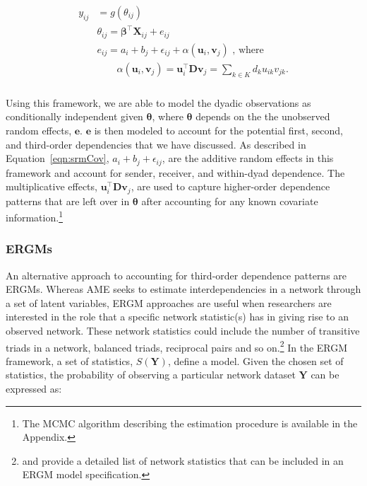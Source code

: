 \documentclass[12pt,pdflatex]{elsarticle}
\begin{document}
\begin{align}
\begin{aligned}
	y_{ij} &= g(\theta_{ij}) \\
	&\theta_{ij} = \bm\beta^{\top} \mathbf{X}_{ij} + e_{ij} \\
	&e_{ij} = a_{i} + b_{j}  + \epsilon_{ij} + \alpha(\textbf{u}_{i}, \textbf{v}_{j}) \text{  , where } \\
	&\qquad \alpha(\textbf{u}_{i}, \textbf{v}_{j}) = \textbf{u}_{i}^{\top} \textbf{D} \textbf{v}_{j} = \sum_{k \in K} d_{k} u_{ik} v_{jk}. \\
\label{eqn:ame}
\end{aligned}
\end{align}

Using this framework, we are able to model the dyadic observations as conditionally independent given $\bm\theta$, where $\bm\theta$ depends on the the unobserved random effects, $\mathbf{e}$. $\mathbf{e}$ is then modeled to account for the potential first, second, and third-order dependencies that we have discussed. As described in Equation~\ref{eqn:srmCov}, $a_{i} + b_{j}  + \epsilon_{ij}$, are the additive random effects in this framework and account for sender, receiver, and within-dyad dependence. The multiplicative effects, $\textbf{u}_{i}^{\top} \textbf{D} \textbf{v}_{j}$, are used to capture higher-order dependence patterns that are left over in $\bm\theta$ after accounting for any known covariate information.\footnote{The MCMC algorithm describing the estimation procedure is available in the Appendix.} 

\subsubsection*{\textbf{ERGMs}}

An alternative approach to accounting for third-order dependence patterns are ERGMs. Whereas AME seeks to estimate interdependencies in a network through a set of latent variables, ERGM approaches are useful when researchers are interested in the role that a specific network statistic(s) has in giving rise to an observed network. These network statistics could include the number of transitive triads in a network, balanced triads, reciprocal pairs and so on.\footnote{\citet{morris:etal:2008} and \citet{snijders:etal:2006} provide a detailed list of network statistics that can be included in an ERGM model specification.} In the ERGM framework, a set of statistics, $S(\mathbf{Y})$, define a model. Given the chosen set of statistics, the probability of observing a particular network dataset $\mathbf{Y}$ can be expressed as:
\end{document}
